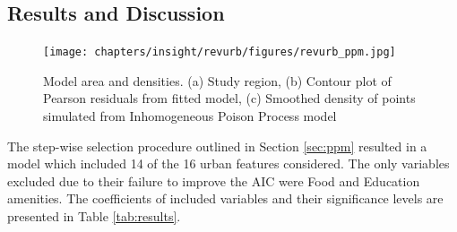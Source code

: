 \subsection{Results and Discussion}
{


    \begin{figure}[!h]
        \centering
        \texttt{[image: chapters/insight/revurb/figures/revurb\_ppm.jpg]}
        \caption{Model area and densities. (a) Study region, (b) Contour plot of Pearson residuals from fitted model, (c) Smoothed density of points simulated from Inhomogeneous Poison Process model}
        \label{fig:ppm_res}
    \end{figure}

    The step-wise selection procedure outlined in Section \eqref{sec:ppm} resulted in a model which included 14 of the 16 urban features considered. The only variables excluded due to their failure to improve the AIC were Food and Education amenities. The coefficients of included variables and their significance levels are presented in Table \eqref{tab:results}.

}
